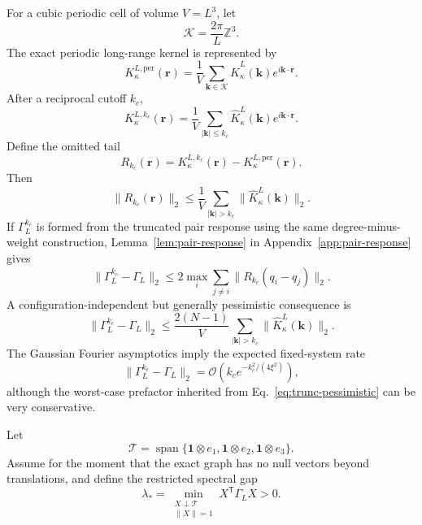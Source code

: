 \documentclass[11pt]{article}
\theoremstyle{plain}
\newcommand{\rr}{\bm r}
\newcommand{\kk}{\bm k}
\newcommand{\cT}{\mathcal{T}}
\DeclareRobustCommand{\_}{\textunderscore\allowbreak}
\begin{document}
For a cubic periodic cell of volume $V=L^3$, let
\begin{equation}
\mathcal K
=
\frac{2\pi}{L}\mathbb Z^3.
\end{equation}
The exact periodic long-range kernel is represented by
\begin{equation}
K_\kappa^{L,\mathrm{per}}(\rr)
=
\frac1V
\sum_{\kk\in\mathcal K}
\widehat K_\kappa^L(\kk)e^{i\kk\cdot\rr}.
\end{equation}
After a reciprocal cutoff $k_c$,
\begin{equation}
K_\kappa^{L,k_c}(\rr)
=
\frac1V
\sum_{|\kk|\le k_c}
\widehat K_\kappa^L(\kk)e^{i\kk\cdot\rr}.
\end{equation}
Define the omitted tail
\begin{equation}
R_{k_c}(\rr)
=
K_\kappa^{L,k_c}(\rr)
-
K_\kappa^{L,\mathrm{per}}(\rr).
\end{equation}
Then
\begin{equation}
\|R_{k_c}(\rr)\|_2
\le
\frac1V
\sum_{|\kk|>k_c}
\|\widehat K_\kappa^L(\kk)\|_2.
\end{equation}
If $\Gamma_L^{k_c}$ is formed from the truncated pair response using the
same degree-minus-weight construction, Lemma~\ref{lem:pair-response} in
Appendix~\ref{app:pair-response} gives
\begin{equation}
\label{eq:trunc-bound}
\|\Gamma_L^{k_c}-\Gamma_L\|_2
\le
2\max_i
\sum_{j\ne i}
\|R_{k_c}(q_i-q_j)\|_2.
\end{equation}
A configuration-independent but generally pessimistic consequence is
\begin{equation}
\label{eq:trunc-pessimistic}
\|\Gamma_L^{k_c}-\Gamma_L\|_2
\le
\frac{2(N-1)}{V}
\sum_{|\kk|>k_c}
\|\widehat K_\kappa^L(\kk)\|_2.
\end{equation}
The Gaussian Fourier asymptotics imply the expected fixed-system rate
\begin{equation}
\|\Gamma_L^{k_c}-\Gamma_L\|_2
=
\mathcal{O}\!\left(
k_c e^{-k_c^2/(4\xi^2)}
\right),
\end{equation}
although the worst-case prefactor inherited from
Eq.~\eqref{eq:trunc-pessimistic} can be very conservative.

Let
\begin{equation}
\cT
=
\operatorname{span}
\{\mathbf 1\otimes e_1,
\mathbf 1\otimes e_2,
\mathbf 1\otimes e_3\}.
\end{equation}
Assume for the moment that the exact graph has no null vectors beyond
translations, and define the restricted spectral gap
\begin{equation}
\label{eq:gap}
\lambda_*
=
\min_{\substack{X\perp\cT\\ \|X\|=1}}
X^{\mathsf T}\Gamma_LX
>0.
\end{equation}
\end{document}
